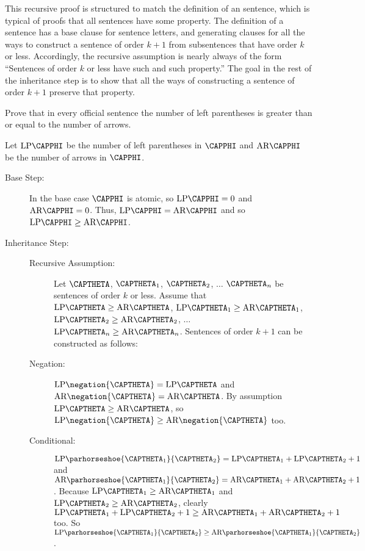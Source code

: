 \begin{commentary}
	This recursive proof is structured to match the definition of an \GSL{} sentence, which is typical of proofs that all \GSL{} sentences have some property.
	The definition of a sentence has a base clause for sentence letters, and generating clauses for all the ways to construct a sentence of order $k+1$ from subsentences that have order $k$ or less.
	Accordingly, the recursive assumption is nearly always of the form ``Sentences of order $k$ or less have such and such property.''
	The goal in the rest of the inheritance step is to show that all the ways of constructing a sentence of order $k+1$ preserve that property.
\end{commentary}

\begin{majorILnc}{} 
Prove that in every official \GSL{} sentence the number of left parentheses is greater than or equal to the number of arrows.
\begin{PROOF}
Let $\LP\CAPPHI$ be the number of left parentheses in $\CAPPHI$ and $\HHH\CAPPHI$ be the number of arrows in $\CAPPHI$.
\begin{description}
\item[Base Step:] In the base case $\CAPPHI$ is atomic, so $\LP\CAPPHI=0$ and $\HHH\CAPPHI=0$.  Thus, $\LP\CAPPHI=\HHH\CAPPHI$ and so $\LP\CAPPHI\geq\HHH\CAPPHI$.
\item[Inheritance Step:] \hfill{}
\begin{description}
\item[Recursive Assumption:] Let $\CAPTHETA$, $\CAPTHETA_1$, $\CAPTHETA_2$, $\ldots$ $\CAPTHETA_{\integer{n}}$ be sentences of order $k$ or less. 
Assume that $\LP\CAPTHETA\geq\HHH\CAPTHETA$, $\LP\CAPTHETA_1\geq\HHH\CAPTHETA_1$, $\LP\CAPTHETA_2\geq\HHH\CAPTHETA_2$, $\ldots$ $\LP\CAPTHETA_{\integer{n}}\geq\HHH\CAPTHETA_{\integer{n}}$. Sentences of order $k+1$ can be constructed as follows: 
\item[Negation:] $\LP\negation{\CAPTHETA}=\LP\CAPTHETA$ and $\HHH\negation{\CAPTHETA}=\HHH\CAPTHETA$. By assumption $\LP\CAPTHETA\geq\HHH\CAPTHETA$, so $\LP\negation{\CAPTHETA}\geq\HHH\negation{\CAPTHETA}$ too.
\item[Conditional:] $\LP\parhorseshoe{\CAPTHETA_1}{\CAPTHETA_2}=\LP\CAPTHETA_1+\LP\CAPTHETA_2+1$ and $\HHH\parhorseshoe{\CAPTHETA_1}{\CAPTHETA_2}=\HHH\CAPTHETA_1+\HHH\CAPTHETA_2+1$. Because $\LP\CAPTHETA_1\geq\HHH\CAPTHETA_1$ and $\LP\CAPTHETA_2\geq\HHH\CAPTHETA_2$, clearly $\LP\CAPTHETA_1+\LP\CAPTHETA_2+1\geq\HHH\CAPTHETA_1+\HHH\CAPTHETA_2+1$ too. So $\LP\parhorseshoe{\CAPTHETA_1}{\CAPTHETA_2}\geq\HHH\parhorseshoe{\CAPTHETA_1}{\CAPTHETA_2}$.

\end{description}
\end{description}
\end{PROOF}
\end{majorILnc}
